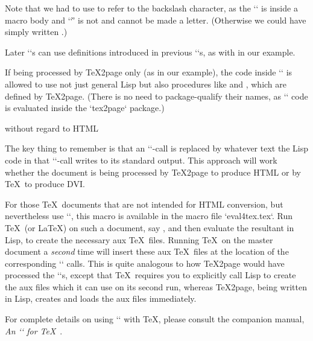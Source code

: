 {{{{{{{{{\begintt
\ifx\shipout\UnDeFiNeD
{}

\def\spaceifnotempty{\eval{
\endtt
\begintts
(let ((x (ungroup (get-token))))
  (unless (all-blanks-p x)
    (princ (code-char 92))
    (princ "space")))
\endtt
\begintt
}}
\fi
\endtt
Note that we had to use  to refer to the
backslash character, as the `\eval` is inside a macro body and ‘`\`’
is not and cannot be made a letter.
(Otherwise we could have simply written .)

Later `\eval`s can
use definitions introduced in previous `\eval`s,
as with  in our example.

If being processed by \TeX2page only (as in our example),
the code inside `\eval` is allowed to use not just general Lisp
but also procedures like
 and , which are defined by
\TeX2page. (There is no need to package-qualify their names, as `\eval`
code is evaluated inside the `tex2page` package.)

 without regard to HTML

%
The key thing to remember is that
an `\eval`-call is replaced by whatever text the
Lisp code in that `\eval`-call writes to its
standard output.  This approach will work whether the
document is being processed by \TeX2page to produce HTML
or by \TeX\ to produce DVI.

For those \TeX\ documents that are not intended for HTML conversion, but
nevertheless use `\eval`, this macro is available in the macro file
`eval4tex.tex`.  Run \TeX\ (or \LaTeX) on such a document, say
, and then evaluate
the resultant  in Lisp, to create the
necessary aux \TeX\ files.  Running \TeX\ on the master document a {\em second}
time will
insert these aux \TeX\ files at the location of the corresponding `\eval`
calls.  This is quite analogous to how \TeX2page would have processed the
`\eval`s, except that \TeX\ requires you to explicitly call Lisp to
create the aux files which it can use on its second run, whereas
\TeX2page, being written in Lisp, creates and loads the aux files
immediately.

For complete details on using `\eval` with
\TeX, please consult the companion manual,
{\em An `\eval` for
\TeX}~\cite{eval4tex}.

}}}}}}}}}
